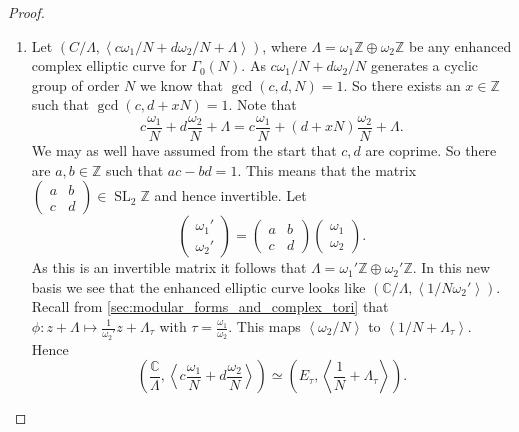 \documentclass[a4paper]{article}
\theoremstyle{theoremdd}
\theoremstyle{definitiondd}
\theoremstyle{remarkdd}
\newcommand{\Z}{\mathbb{Z}}
\newcommand{\C}{\mathbb{C}}
\DeclareMathOperator{\SL}{SL}
\begin{document}
\begin{proof}
	\begin{enumerate}
		\item Let $\left( C / \Lambda, \left< c \omega_1 / N  + d \omega_2 / N  + \Lambda\right> \right) $, where $\Lambda = \omega_1 \Z \oplus \omega_2 \Z$ be any enhanced complex elliptic curve for $\Gamma_0(N)$.
			As $c \omega_1 / N + d \omega_2 /N$ generates a cyclic group of order $N$ we know that $\gcd(c, d, N) = 1$. 
			So there exists an $x \in \Z$ such that $\gcd(c, d + xN) = 1$. 
			Note that \[
				c \frac{\omega_1}{N}  + d \frac{\omega_2}{N}  + \Lambda =  c \frac{\omega_1}{N} + (d + xN) \frac{\omega_2}{N}+ \Lambda
		.\]
		We may as well have assumed from the start that $c, d$ are coprime.
		So there are $a, b \in \Z $ such that $ac - bd = 1$. 
		This means that the matrix  $\begin{pmatrix} a & b \\ c& d \end{pmatrix}  \in \SL_2\Z$ and hence invertible. 
		Let \[
		\begin{pmatrix} \omega_1' \\ \omega_2' \end{pmatrix}  = 
		\begin{pmatrix} a & b \\ c & d \end{pmatrix} 
		\begin{pmatrix} \omega_1 \\ \omega_2 \end{pmatrix} 
		.\] 
		As this is an invertible matrix it follows that $\Lambda = \omega_1' \Z \oplus \omega_2' \Z$. 
	In this new basis we see that the enhanced elliptic curve looks like $(\C / \Lambda, \left< 1 / N \omega_2'\right>)$.
	Recall from \cref{sec:modular_forms_and_complex_tori} that  $\phi: z  + \Lambda \mapsto  \frac{1}{\omega_2'} z + \Lambda_\tau$ with $\tau = \frac{\omega_1}{\omega_2}$. 
	This maps  $\left<\omega_2 / N \right>$ to $\left<1 / N + \Lambda_\tau \right>$.
	Hence  \[
		\left( \frac{\C}{\Lambda}, \left<c \frac{\omega_1}{N} + d \frac{\omega_2}{N} \right> \right) 	\simeq  
		\left( E_\tau, \left<\frac{1}{N} + \Lambda_\tau \right> \right) 
	.\] 



\end{enumerate}
\end{proof}
\end{document}
